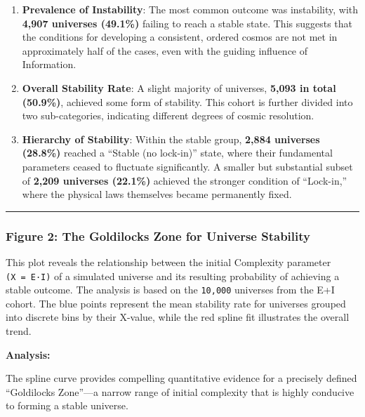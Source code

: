 \begin{enumerate}
\def\labelenumi{\arabic{enumi}.}
\item
  \textbf{Prevalence of Instability}: The most common outcome was
  instability, with \textbf{4,907 universes (49.1\%)} failing to reach a
  stable state. This suggests that the conditions for developing a
  consistent, ordered cosmos are not met in approximately half of the
  cases, even with the guiding influence of Information.
\item
  \textbf{Overall Stability Rate}: A slight majority of universes,
  \textbf{5,093 in total (50.9\%)}, achieved some form of stability.
  This cohort is further divided into two sub-categories, indicating
  different degrees of cosmic resolution.
\item
  \textbf{Hierarchy of Stability}: Within the stable group,
  \textbf{2,884 universes (28.8\%)} reached a ``Stable (no lock-in)''
  state, where their fundamental parameters ceased to fluctuate
  significantly. A smaller but substantial subset of \textbf{2,209
  universes (22.1\%)} achieved the stronger condition of ``Lock-in,''
  where the physical laws themselves became permanently fixed.
\end{enumerate}

\begin{center}\rule{0.5\linewidth}{0.5pt}\end{center}

\subsubsection{Figure 2: The Goldilocks Zone for Universe
Stability}\label{figure-2-the-goldilocks-zone-for-universe-stability}

This plot reveals the relationship between the initial Complexity
parameter \texttt{(X\ =\ E·I)} of a simulated universe and its resulting
probability of achieving a stable outcome. The analysis is based on the
\texttt{10,000} universes from the E+I cohort. The blue points represent
the mean stability rate for universes grouped into discrete bins by
their X-value, while the red spline fit illustrates the overall trend.

\textbf{Analysis:}

The spline curve provides compelling quantitative evidence for a
precisely defined ``Goldilocks Zone''---a narrow range of initial
complexity that is highly conducive to forming a stable universe.

